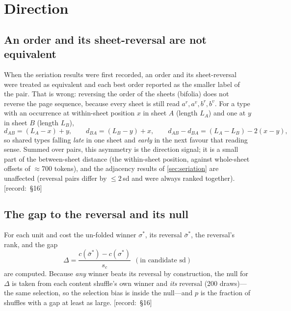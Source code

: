 \documentclass[11pt,a4paper]{article}
\newcommand{\src}[1]{{\footnotesize\color{muted}\sffamily\mbox{[record: \S#1]}}}
\begin{document}
\section{Direction}
\label{sec:direction}

\subsection{An order and its sheet-reversal are not equivalent}

When the seriation results were first recorded, an order and its sheet-reversal were treated as equivalent and each best order reported as the smaller label of the pair. That is wrong: reversing the order of the sheets (bifolia) does not reverse the page sequence, because every sheet is still read $a^r,a^v,b^r,b^v$. For a type with an occurrence at within-sheet position $x$ in sheet $A$ (length $L_A$) and one at $y$ in sheet $B$ (length $L_B$),
\begin{equation}
d_{AB}=(L_A-x)+y,\qquad d_{BA}=(L_B-y)+x,\qquad d_{AB}-d_{BA}=(L_A-L_B)-2(x-y),
\label{eq:direction}
\end{equation}
so shared types falling \emph{late} in one sheet and \emph{early} in the next favour that reading sense. Summed over pairs, this asymmetry is the direction signal; it is a small part of the between-sheet distance (the within-sheet position, against whole-sheet offsets of $\approx$700 tokens), and the adjacency results of \cref{sec:seriation} are unaffected (reversal pairs differ by $\le2$\,sd and were always ranked together). \src{16}

\subsection{The gap to the reversal and its null}

For each unit and cost the un-folded winner $\sigma^\ast$, its reversal $\bar\sigma^\ast$, the reversal's rank, and the gap
\begin{equation}
\Delta=\frac{c(\bar\sigma^\ast)-c(\sigma^\ast)}{s_c}\ \ (\text{in candidate sd})
\label{eq:delta}
\end{equation}
are computed. Because \emph{any} winner beats its reversal by construction, the null for $\Delta$ is taken from each content shuffle's own winner and \emph{its} reversal (200 draws)---the same selection, so the selection bias is inside the null---and $p$ is the fraction of shuffles with a gap at least as large. \src{16}
\end{document}
